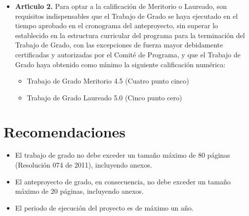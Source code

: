 \begin{itemize} 
\item \textbf{Art\'{\i}culo 2.} Para optar a la calificaci\'{o}n de Meritorio o Laureado,
son requisitos indispensables que el Trabajo de Grado se haya
ejecutado en el tiempo aprobado en el cronograma del
anteproyecto, sin superar lo establecido en la estructura curricular
del programa para la terminaci\'{o}n del Trabajo de Grado, con las
excepciones de fuerza mayor debidamente certificadas y
autorizadas por el Comit\'{e} de Programa, y que el Trabajo de Grado
haya obtenido como m\'{\i}nimo la siguiente calificaci\'{o}n num\'{e}rica:
\begin{itemize}
\item Trabajo de Grado Meritorio 4.5 (Cuatro punto cinco)
\item Trabajo de Grado Laureado 5.0 (Cinco punto cero)
\end{itemize}
\end{itemize}

\section{Recomendaciones}
\begin{itemize}
\item El trabajo de grado no debe exceder un tama\~{n}o m\'{a}ximo de 80
p\'{a}ginas (Resoluci\'{o}n 074 de 2011), incluyendo anexos.
\item El anteproyecto de grado, en consecuencia, no debe exceder un
tama\~{n}o m\'{a}ximo de 20 p\'{a}ginas, incluyendo anexos.
\item El periodo de ejecuci\'{o}n del proyecto es de m\'{a}ximo un a\~{n}o.
\end{itemize}